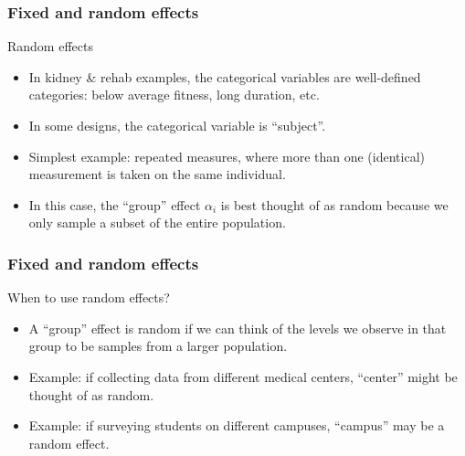 \documentclass[handout]{beamer}
\begin{document}

   \begin{frame} \frametitle{Fixed and random effects}

   \begin{block}
   {Random effects}
   \begin{itemize}

   \item In kidney \& rehab examples, the categorical variables are well-defined categories: below average fitness, long duration, etc.

   \item In some designs, the categorical variable is ``subject''.

   \item Simplest example: repeated measures, where more than one (identical) measurement is taken on the same individual.

   \item In this case, the ``group'' effect $\alpha_i$ is best thought of as random because we only sample a subset of the entire population.
   \end{itemize}
   \end{block}
   \end{frame}


   \begin{frame} \frametitle{Fixed and random effects}

   \begin{block}
   {When to use random effects?}
   \begin{itemize}
   \item A ``group'' effect is random if we can think of the levels we observe in that group to be samples from a larger population.

   \item Example: if collecting data from different medical centers, ``center'' might be thought of as random.

   \item Example: if surveying students on different campuses, ``campus'' may be a random effect.

   \end{itemize}
   \end{block}
   \end{frame}

\end{document}
